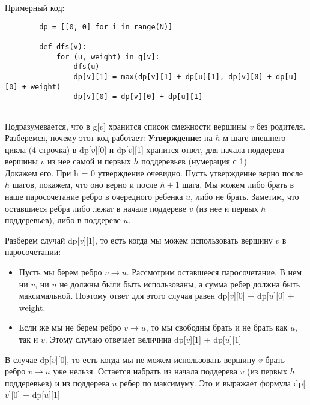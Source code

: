 \documentclass[a4paper,12pt]{article}
\begin{document}
      Примерный код:
      \begin{lstlisting}
      	dp = [[0, 0] for i in range(N)]
      	
      	def dfs(v):
      	    for (u, weight) in g[v]:
      	        dfs(u)
      	        dp[v][1] = max(dp[v][1] + dp[u][1], dp[v][0] + dp[u][0] + weight)
      	        dp[v][0] = dp[v][0] + dp[u][1]
      	    	
      \end{lstlisting}
	  
	  Подразумевается, что в g[$v$] хранится список смежности вершины
      $v$ без родителя.\\
      
      Разберемся, почему этот код работает:
      \textbf{Утверждение:} на $h$-м шаге внешнего цикла (4 строчка) 
      в dp[$v$][0] и dp[$v$][1] хранится ответ, для начала поддерева 
      вершины $v$ из нее самой и первых $h$ поддеревьев (нумерация с 1)
      \\
      
      Докажем его. При h = 0 утверждение очевидно. Пусть утверждение верно 
      после $h$ шагов, покажем, что оно верно и после $h + 1$ шага. Мы можем
      либо брать в наше паросочетание ребро в очередного ребенка $u$, либо не
      брать. Заметим, что оставшиеся ребра либо лежат в начале поддереве $v$ 
      (из нее и первых $h$ поддеревьев), либо в поддереве $u$.
      
      Разберем случай dp[$v$][1], то есть когда мы можем использовать 
      вершину $v$ в паросочетании:
      \begin{itemize}
          \item Пусть мы берем ребро $v \rightarrow u$. Рассмотрим оставшееся
          паросочетание. В нем ни $v$, ни $u$ не должны были быть использованы,
          а сумма ребер должна быть максимальной. Поэтому ответ для этого случая
          равен dp[$v$][0] + dp[$u$][0] + weight. 
      
          \item Если же мы не берем ребро $v \rightarrow u$, то мы свободны 
          брать и не брать как $u$, так и $v$. Этому случаю отвечает величина
          dp[$v$][1] + dp[$u$][1]
      \end{itemize}
      
      В случае dp[$v$][0], то есть когда мы не можем использовать вершину $v$
      брать ребро $v \rightarrow u$ уже нельзя. Остается набрать из начала 
      поддерева $v$ (из первых $h$ поддеревьев) и из поддерева $u$ ребер 
      по максимуму. Это и выражает формула dp[$v$][0] + dp[$u$][1]
      \\
      
\end{document}
